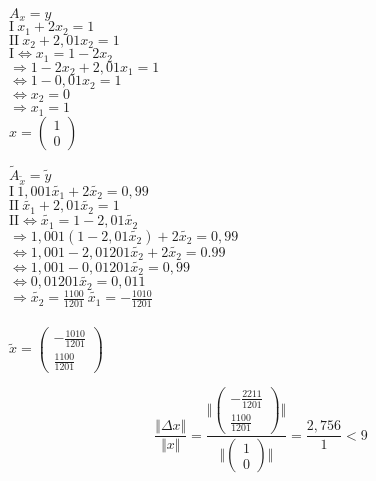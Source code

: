 \documentclass[a4paper,10pt]{article}
\begin{document}
\begin{enumerate}[a)]
\begin{enumerate}[b1)]
			\begin{multicols}{2}
				\begin{center}
					$A_x = y$\\
					$\mathrm{I} \ x_1 + 2x_2 = 1$\\
					$\mathrm{II} \ x_2 + 2,01x_2 = 1$\\
					$\mathrm{I} \Leftrightarrow x_1 = 1 -2x_2$\\
					$\Rightarrow 1 -2x_2 + 2,01x_1 = 1$\\
					$\Leftrightarrow 1 - 0,01x_2 = 1$\\
					$\Leftrightarrow x_2 = 0$\\
					$\Rightarrow x_1 = 1$\\
					$x = \begin{pmatrix}
					1\\
					0
					\end{pmatrix}
					$
				\end{center}
				\columnbreak
				\begin{center}
					$\tilde{A}_{\tilde{x}} = \tilde{y}$\\
					$\mathrm{I} \ 1,001 \tilde{x_1} + 2\tilde{x_2} = 0,99$\\
					$\mathrm{II} \ \tilde{x_1} + 2,01\tilde{x_2} = 1$\\
					$\mathrm{II} \Leftrightarrow \tilde{x_1} = 1 - 2,01\tilde{x_2}$\\
					$\Rightarrow 1,001(1 - 2,01\tilde{x_2}) + 2\tilde{x_2} = 0,99$\\
					$\Leftrightarrow 1,001 - 2,01201\tilde{x_2} + 2\tilde{x_2} = 0.99$\\
					$\Leftrightarrow 1,001 - 0,01201\tilde{x_2} = 0,99$\\
					$\Leftrightarrow 0,01201 \tilde{x_2} = 0,011$\\
					$\Rightarrow \tilde{x_2} = \frac{1100}{1201} \ \tilde{x_1} = -\frac{1010}{1201}$\\ \ \\
					$\tilde{x} = 
					\begin{pmatrix}
					-\frac{1010}{1201}\\[2pt]
					\frac{1100}{1201}
					\end{pmatrix}$
				\end{center}
			\end{multicols}
			\[
			\dfrac{\Vert \varDelta x \Vert}{\Vert x \Vert} = \dfrac{\Big \Vert \begin{pmatrix} -\frac{2211}{1201} \\[2pt] \frac{1100}{1201} \end{pmatrix} \Big \Vert} {\Big \Vert \begin{pmatrix} 1\\ 0 \end{pmatrix} \Big \Vert} = \dfrac{2,756}{1} < 9
			\]
		\end{enumerate}
		
		
	\end{enumerate}
	
	
	
\end{document}
